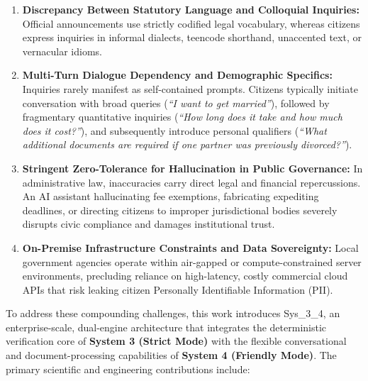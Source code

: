 \documentclass[11pt,a4paper]{article}
\newcommand{\sys}{\mbox{Sys\_3\_4}}
\begin{document}
\begin{enumerate}[label=\arabic*.]
\item \textbf{Discrepancy Between Statutory Language and Colloquial Inquiries:} Official announcements
use strictly codified legal vocabulary, whereas citizens express inquiries in informal dialects,
teencode shorthand, unaccented text, or vernacular idioms.
\item \textbf{Multi-Turn Dialogue Dependency and Demographic Specifics:} Inquiries rarely manifest as
self-contained prompts. Citizens typically initiate conversation with broad queries (\emph{``I want to
get married''}), followed by fragmentary quantitative inquiries (\emph{``How long does it take and how
much does it cost?''}), and subsequently introduce personal qualifiers (\emph{``What additional
documents are required if one partner was previously divorced?''}).
\item \textbf{Stringent Zero-Tolerance for Hallucination in Public Governance:} In administrative law,
inaccuracies carry direct legal and financial repercussions. An AI assistant hallucinating fee
exemptions, fabricating expediting deadlines, or directing citizens to improper jurisdictional bodies
severely disrupts civic compliance and damages institutional trust.
\item \textbf{On-Premise Infrastructure Constraints and Data Sovereignty:} Local government agencies
operate within air-gapped or compute-constrained server environments, precluding reliance on
high-latency, costly commercial cloud APIs that risk leaking citizen Personally Identifiable
Information (PII).
\end{enumerate}

To address these compounding challenges, this work introduces \sys{}, an enterprise-scale, dual-engine
architecture that integrates the deterministic verification core of \textbf{System 3 (Strict Mode)}
with the flexible conversational and document-processing capabilities of \textbf{System 4 (Friendly
Mode)}. The primary scientific and engineering contributions include:
\end{document}
